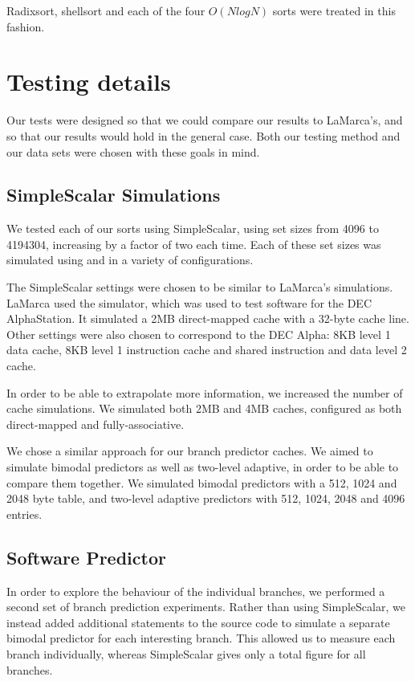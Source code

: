 Radixsort, shellsort and each of the four $O(NlogN)$ sorts were treated in this
fashion.

\section{Testing details}

Our tests were designed so that we could compare our results to LaMarca's, and
so that our results would hold in the general case. Both our testing method and
our data sets were chosen with these goals in mind.

\subsection{SimpleScalar Simulations}

We tested each of our sorts using SimpleScalar, using set sizes from 4096 to
4194304, increasing by a factor of two each time. Each of these set sizes was
simulated using  and  in a variety of
configurations.

The SimpleScalar settings were chosen to be similar to LaMarca's simulations.
LaMarca used the  simulator, which was used to test software for the DEC
AlphaStation. It simulated a 2MB direct-mapped cache with a 32-byte cache line.
Other settings were also chosen to correspond to the DEC Alpha: 8KB level 1 data
cache, 8KB level 1 instruction cache and shared instruction and data level 2
cache.

In order to be able to extrapolate more information, we increased the number of
cache simulations. We simulated both 2MB and 4MB caches, configured as both
direct-mapped and fully-associative.

We chose a similar approach for our branch predictor caches. We aimed to
simulate bimodal predictors as well as two-level adaptive, in order to be able to
compare them together. We simulated bimodal predictors with a 512, 1024 and
2048 byte table, and two-level adaptive predictors with 512, 1024, 2048 and 4096
entries.

\subsection{Software Predictor}
In order to explore the behaviour of the individual branches, we performed a
second set of branch prediction experiments. Rather than using SimpleScalar, we
instead added additional statements to the source code to simulate a separate
bimodal predictor for each interesting branch. This allowed us to measure each
branch individually, whereas SimpleScalar gives only a total figure for all
branches.

